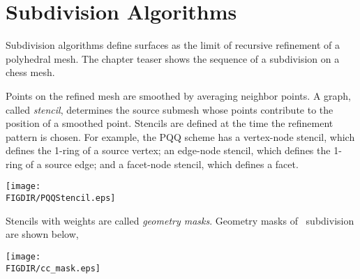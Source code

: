  



\section{Subdivision Algorithms}
Subdivision algorithms define surfaces as the limit
of recursive refinement of a polyhedral mesh. The chapter teaser
shows the sequence of a subdivision on a chess mesh.

Points on the refined mesh are smoothed by averaging
neighbor points. A graph, called \emph{stencil}, 
determines the source submesh whose points contribute to the 
position of a smoothed point. Stencils are defined at the time 
the refinement pattern is chosen. For example, 
the PQQ scheme has a vertex-node stencil, which defines 
the 1-ring of a source vertex; an edge-node stencil, which 
defines the 1-ring of a source edge; and a facet-node stencil,
which defines a facet.

\begin{ccTexOnly}
  \begin{center}
    \parbox{0.5\textwidth}{%
      \texttt{[image: \\FIGDIR/PQQStencil.eps]}%
    }
  \end{center}
\end{ccTexOnly}

Stencils with weights are called \emph{geometry masks}.
Geometry masks of \CC\ subdivision are shown below,

\begin{ccTexOnly}
  \begin{center}
    \parbox{0.4\textwidth}{%
      \texttt{[image: \\FIGDIR/cc\_mask.eps]}%
    }
  \end{center}
\end{ccTexOnly}

